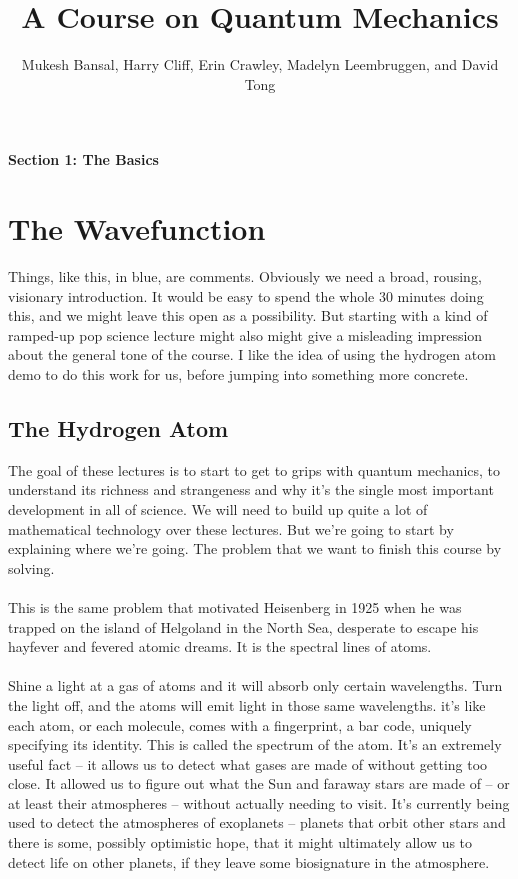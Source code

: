 \documentclass[12pt]{article}
\title{A Course on Quantum Mechanics}
\author{Mukesh Bansal, Harry Cliff, Erin Crawley, Madelyn Leembruggen, and David Tong}
\newcommand\para{\paragraph{}}
\begin{document}
\pagestyle{plain} \setcounter{page}{1}
\baselineskip16pt \setcounter{section}{0}


\maketitle






\newpage
\noindent
{\Large \bf Section 1: The Basics}



\section{The Wavefunction}

{ \color{blue}Things, like this, in blue, are comments. Obviously we need a broad, rousing, visionary introduction. It would be easy to spend the whole 30 minutes doing this, and we might leave this open as a possibility. But starting with a kind of ramped-up pop science lecture might also might give a misleading impression about the general tone of the course. I like the idea of using the hydrogen atom demo to do this work for us, before jumping into something more concrete.}



 
 \subsection{The Hydrogen Atom}
 
The goal of these lectures is to start to get to grips with quantum mechanics, to understand its richness and strangeness and why it's the single most important development in all of science. We will need to build up quite a lot of mathematical technology over these lectures. But we're going to start by explaining where we're going. The problem that we want to finish this course by solving. 

\para
This is the same problem that motivated Heisenberg in 1925 when he was trapped on the island of Helgoland in the North Sea, desperate to escape his hayfever and fevered atomic dreams. It is the spectral lines of atoms.

\para
Shine a light at a gas of atoms and it will absorb only certain wavelengths. Turn the light off, and the atoms will emit light in those same wavelengths. it's like each atom, or each molecule, comes with a fingerprint, a bar code, uniquely specifying its identity.  This is called the spectrum of the atom. It's an extremely useful fact -- it allows us to detect what gases are made of without getting too close. It allowed us to figure out what the Sun and faraway stars are made of -- or at least their atmospheres -- without actually needing to visit. It's currently being used to detect the atmospheres of exoplanets -- planets that orbit other stars and there is some, possibly optimistic hope, that it might ultimately allow us to detect life on other planets, if they leave some biosignature in the atmosphere.
\end{document}
